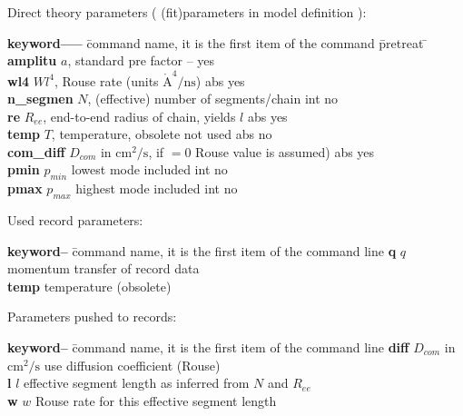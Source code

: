 \documentclass[11pt,fleqn]{book} %
\newcommand{\linespace}{\vspace{4ex}}
\begin{document}
Direct theory parameters ( (fit)parameters in model definition ):
\begin{tabbing}
\textbf{keyword-----}  \= command name, it is the first item of the command \= pretreat   \=   \kill     
\textbf{amplitu  } \>  $a$, standard pre factor                          \>  --        \> yes      \\    
\textbf{wl4      } \>  $W l^4$, Rouse rate (units ${\mathrm{\mathring{A}^4/ns}}$) \>  abs       \> yes      \\
\textbf{n\_segmen } \>  $N$, (effective) number of segments/chain        \>  int       \> no       \\              
\textbf{re       } \>  $R_{ee}$, end-to-end radius of chain, yields $l$ \>  abs       \> yes      \\
\textbf{temp     } \>  $T$, temperature, obsolete not used              \>  abs       \> no       \\
\textbf{com\_diff } \>  $D_{com}$ in ${\mathrm{cm^2/s}}$, if $=0$ Rouse value is assumed) \> abs \> yes \\
\textbf{pmin     } \>  $p_{min}$ lowest mode included                   \>  int       \> no       \\
\textbf{pmax     } \>  $p_{max}$ highest mode included                  \>  int       \> no       \\
\end{tabbing}



\linespace
Used record parameters: 
\begin{tabbing}
\textbf{keyword--}  \= command name, it is the first item of the command line                    \kill
\textbf{q   } \>  $q$ momentum transfer of record data         \\         
\textbf{temp } \> temperature (obsolete)        \\         
\end{tabbing}

\linespace
Parameters pushed to records:
\begin{tabbing}
\textbf{keyword--}  \= command name, it is the first item of the command line                    \kill
\textbf{diff} \>  $D_{com}$ in ${\mathrm{cm^2/s}}$ use diffusion coefficient (Rouse)  \\         
\textbf{l} \>  $l$ effective segment length as inferred from ${N}$ and ${R_{ee}}$         \\         
\textbf{w} \>  $w$ Rouse rate for this effective segment length         \\         
\end{tabbing}
\end{document}
